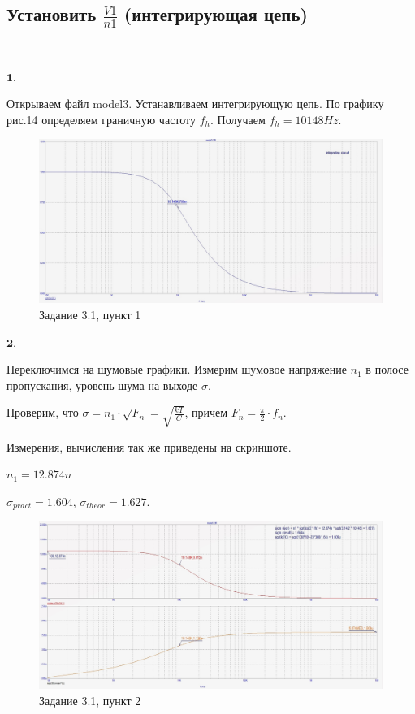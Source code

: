 \documentclass[a4paper, 14pt]{extarticle}%
\begin{document}
\subsection{Установить $\frac{V1}{n1}$ (интегрирующая цепь)}

$ $

$\textbf{1.}$



Открываем файл model3.
Устанавливаем интегрирующую цепь.
По графику рис.14 определяем граничную частоту $f_h$.
Получаем $f_h = 10148 Hz$.


\begin{figure}[h!]
			\centering
			\includegraphics[width=1.1\linewidth]{3/3_1_1.jpg}
			\caption{Задание 3.1, пункт 1}
			\label{A}
\end{figure}

$\textbf{2.} $


Переключимся на шумовые графики. Измерим шумовое напряжение $n_1$ в полосе пропускания, уровень шума на выходе $\sigma$.

Проверим, что $\sigma = n_1\cdot \sqrt{F_n} = \sqrt{\frac{kT}{C}}$, причем $F_n = \frac{\pi}{2} \cdot f_n$.

Измерения, вычисления так же приведены на скриншоте.

$n_1 = 12.874n$

$\sigma_{pract} = 1.604$, $\sigma_{theor} = 1.627$.


\begin{figure}[h!]
			\centering
			\includegraphics[width=1.1\linewidth]{3/3_1_2.jpg}
			\caption{Задание 3.1, пункт 2}
			\label{A}
\end{figure}
\end{document}
